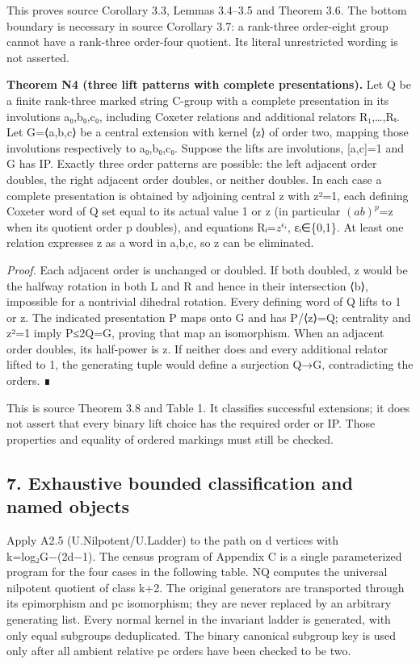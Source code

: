 \documentclass[
  11pt,
  a4paper,
]{article}
\begin{document}
This proves source Corollary 3.3, Lemmas 3.4--3.5 and Theorem 3.6. The
bottom boundary is necessary in source Corollary 3.7: a rank-three
order-eight group cannot have a rank-three order-four quotient. Its
literal unrestricted wording is not asserted.

\textbf{Theorem N4 (three lift patterns with complete presentations).}
Let Q be a finite rank-three marked string C-group with a complete
presentation in its involutions a₀,b₀,c₀, including Coxeter relations
and additional relators R₁,\ldots,Rₜ. Let G=⟨a,b,c⟩ be a central
extension with kernel ⟨z⟩ of order two, mapping those involutions
respectively to a₀,b₀,c₀. Suppose the lifts are involutions, {[}a,c{]}=1
and G has IP. Exactly three order patterns are possible: the left
adjacent order doubles, the right adjacent order doubles, or neither
doubles. In each case a complete presentation is obtained by adjoining
central z with z²=1, each defining Coxeter word of Q set equal to its
actual value 1 or z (in particular \((ab)^{p}\)=z when its quotient
order p doubles), and equations Rᵢ=\(z^{\epsilon _i}\), εᵢ∈\{0,1\}. At
least one relation expresses z as a word in a,b,c, so z can be
eliminated.

\emph{Proof.} Each adjacent order is unchanged or doubled. If both
doubled, z would be the halfway rotation in both L and R and hence in
their intersection ⟨b⟩, impossible for a nontrivial dihedral rotation.
Every defining word of Q lifts to 1 or z. The indicated presentation P
maps onto G and has P/⟨z⟩=Q; centrality and z²=1 imply
\textbar P\textbar≤2\textbar Q\textbar=\textbar G\textbar, proving that
map an isomorphism. When an adjacent order doubles, its half-power is z.
If neither does and every additional relator lifted to 1, the generating
tuple would define a surjection Q→G, contradicting the orders. ∎

This is source Theorem 3.8 and Table 1. It classifies successful
extensions; it does not assert that every binary lift choice has the
required order or IP. Those properties and equality of ordered markings
must still be checked.

\subsection{7. Exhaustive bounded classification and named
objects}\label{exhaustive-bounded-classification-and-named-objects}

Apply A2.5 (U.Nilpotent/U.Ladder) to the path on d vertices with
k=log₂\textbar G\textbar−(2d−1). The census program of Appendix C is a
single parameterized program for the four cases in the following table.
NQ computes the universal nilpotent quotient of class k+2. The original
generators are transported through its epimorphism and pc isomorphism;
they are never replaced by an arbitrary generating list. Every normal
kernel in the invariant ladder is generated, with only equal subgroups
deduplicated. The binary canonical subgroup key is used only after all
ambient relative pc orders have been checked to be two.
\end{document}
